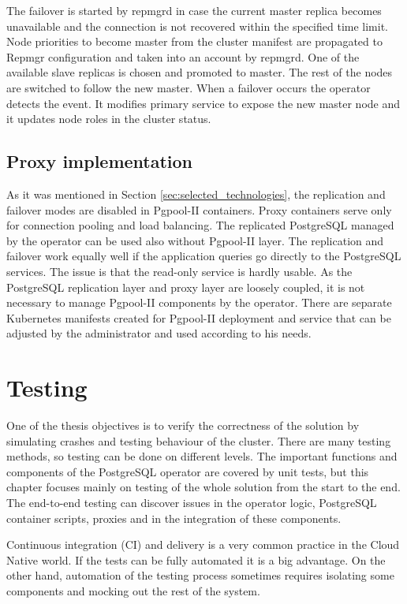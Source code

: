 \documentclass[
  digital, %
  twoside, %
  table,   %
  lof,     %
  lot,     %
]{fithesis3}
\begin{document}
The failover is started by repmgrd in case the current master replica becomes unavailable and the connection is not recovered within the specified time limit. Node priorities to become master from the cluster manifest are propagated to Repmgr configuration and taken into an account by repmgrd. One of the available slave replicas is chosen and promoted to master. The rest of the nodes are switched to follow the new master. When a failover occurs the operator detects the event. It modifies primary service to expose the new master node and it updates node roles in the cluster status.

\section{Proxy implementation}
As it was mentioned in Section \ref{sec:selected_technologies}, the replication and failover modes are disabled in Pgpool-II containers. Proxy containers serve only for connection pooling and load balancing. The replicated PostgreSQL managed by the operator can be used also without Pgpool-II layer. The replication and failover work equally well if the application queries go directly to the PostgreSQL services. The issue is that the read-only service is hardly usable. As the PostgreSQL replication layer and proxy layer are loosely coupled, it is not necessary to manage Pgpool-II components by the operator. There are separate Kubernetes manifests created for Pgpool-II deployment and service that can be adjusted by the administrator and used according to his needs.


\chapter{Testing} \label{chap:testing}
One of the thesis objectives is to verify the correctness of the solution by simulating crashes and testing behaviour of the cluster. There are many testing methods, so testing can be done on different levels. The important functions and components of the PostgreSQL operator are covered by unit tests, but this chapter focuses mainly on testing of the whole solution from the start to the end. The end-to-end testing can discover issues in the operator logic, PostgreSQL container scripts, proxies and in the integration of these components.

Continuous integration (CI) and delivery is a very common practice in the Cloud Native world. If the tests can be fully automated it is a big advantage. On the other hand, automation of the testing process sometimes requires isolating some components and mocking out the rest of the system.
\end{document}
